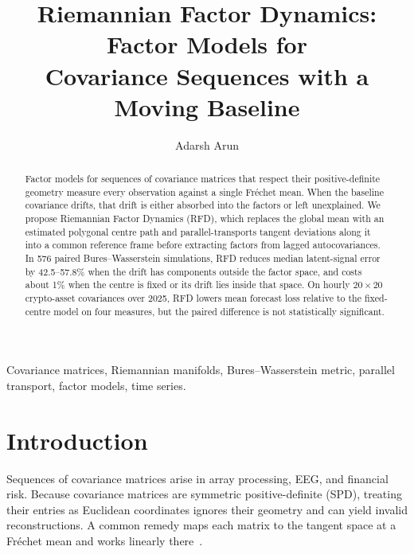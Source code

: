\documentclass[journal]{IEEEtran}
\begin{document}
\title{Riemannian Factor Dynamics: Factor Models for\\
Covariance Sequences with a Moving Baseline}

\author{Adarsh Arun%
}

\maketitle

\begin{abstract}
Factor models for sequences of covariance matrices that respect their
positive-definite geometry measure every observation against a single
Fr\'echet mean. When the baseline covariance drifts, that drift is either
absorbed into the factors or left unexplained. We propose Riemannian
Factor Dynamics (RFD), which replaces the global mean with an estimated
polygonal centre path and parallel-transports tangent deviations along it
into a common reference frame before extracting factors from lagged
autocovariances. In 576 paired Bures--Wasserstein simulations, RFD reduces
median latent-signal error by 42.5--57.8\% when the drift has components
outside the factor space, and costs about 1\% when the centre is fixed or
its drift lies inside that space. On hourly $20\times 20$ crypto-asset
covariances over 2025, RFD lowers mean forecast loss relative to the
fixed-centre model on four measures, but the paired difference is not
statistically significant.
\end{abstract}

\begin{IEEEkeywords}
Covariance matrices, Riemannian manifolds, Bures--Wasserstein metric,
parallel transport, factor models, time series.
\end{IEEEkeywords}

\section{Introduction}
Sequences of covariance matrices arise in array processing, EEG, and
financial risk. Because covariance matrices are symmetric positive-definite
(SPD), treating their entries as Euclidean coordinates ignores their
geometry and can yield invalid reconstructions. A common remedy maps each
matrix to the tangent space at a Fr\'echet mean and works linearly
there~\cite{pennec2006,maman2019}.
\end{document}
